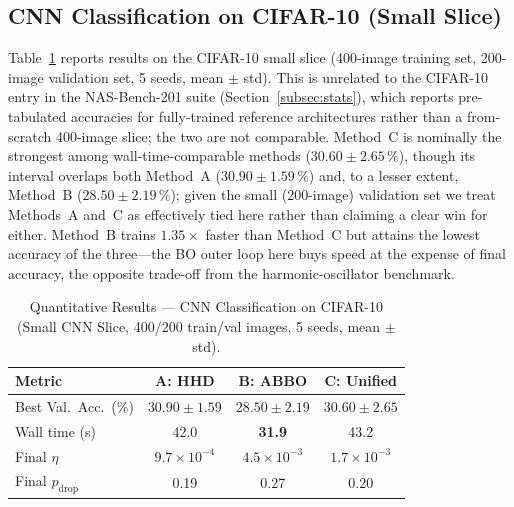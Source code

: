\documentclass[11pt]{article}
\theoremstyle{definition}
\begin{document}
\subsection{CNN Classification on CIFAR-10 (Small Slice)}

Table~\ref{tab:cnn_results} reports results on the CIFAR-10 small
slice (400-image training set, 200-image validation set, 5 seeds,
mean $\pm$ std). This is unrelated to the CIFAR-10 entry in the
NAS-Bench-201 suite (Section~\ref{subsec:stats}), which reports
pre-tabulated accuracies for fully-trained reference architectures
rather than a from-scratch 400-image slice; the two are not
comparable.
Method~C is nominally the strongest among wall-time-comparable
methods ($30.60\pm2.65\,\%$), though its interval overlaps both
Method~A ($30.90\pm1.59\,\%$) and, to a lesser extent, Method~B
($28.50\pm2.19\,\%$); given the small (200-image) validation set
we treat Methods~A and~C as effectively tied here rather than
claiming a clear win for either. Method~B trains $1.35\times$
faster than Method~C but attains the lowest accuracy of the
three---the BO outer loop here buys speed at the expense of final
accuracy, the opposite trade-off from the harmonic-oscillator
benchmark.

\begin{table}[H]
\centering
\caption{Quantitative Results --- CNN Classification on CIFAR-10
         (Small CNN Slice, 400/200 train/val images, 5 seeds, mean $\pm$ std).}
\label{tab:cnn_results}
\renewcommand{\arraystretch}{1.25}
\begin{tabular}{lccc}
\toprule
\textbf{Metric}
  & \textbf{A: HHD}
  & \textbf{B: ABBO}
  & \textbf{C: Unified} \\
\midrule
Best Val.\ Acc.\ (\%)  & $30.90\pm1.59$ & $28.50\pm2.19$ & $\mathbf{30.60\pm2.65}$ \\
Wall time (s)          & 42.0            & \textbf{31.9}  & 43.2 \\
Final $\eta$           & $9.7{\times}10^{-4}$ & $4.5{\times}10^{-3}$
                       & $1.7{\times}10^{-3}$ \\
Final $p_{\mathrm{drop}}$ & 0.19 & 0.27 & 0.20 \\
\bottomrule
\end{tabular}
\end{table}

\end{document}
